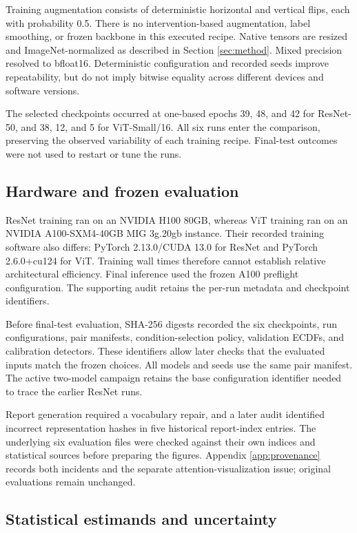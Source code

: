 Training augmentation consists of deterministic horizontal and vertical flips, each with probability 0.5. There is no intervention-based augmentation, label smoothing, or frozen backbone in this executed recipe. Native tensors are resized and ImageNet-normalized as described in Section \ref{sec:method}. Mixed precision resolved to bfloat16. Deterministic configuration and recorded seeds improve repeatability, but do not imply bitwise equality across different devices and software versions.

The selected checkpoints occurred at one-based epochs 39, 48, and 42 for ResNet-50, and 38, 12, and 5 for ViT-Small/16. All six runs enter the comparison, preserving the observed variability of each training recipe. Final-test outcomes were not used to restart or tune the runs.

\subsection{Hardware and frozen evaluation}

ResNet training ran on an NVIDIA H100 80GB, whereas ViT training ran on an NVIDIA A100-SXM4-40GB MIG 3g.20gb instance. Their recorded training software also differs: PyTorch 2.13.0/CUDA 13.0 for ResNet and PyTorch 2.6.0+cu124 for ViT. Training wall times therefore cannot establish relative architectural efficiency. Final inference used the frozen A100 preflight configuration. The supporting audit retains the per-run metadata and checkpoint identifiers.

Before final-test evaluation, SHA-256 digests recorded the six checkpoints, run configurations, pair manifests, condition-selection policy, validation ECDFs, and calibration detectors. These identifiers allow later checks that the evaluated inputs match the frozen choices. All models and seeds use the same pair manifest. The active two-model campaign retains the base configuration identifier needed to trace the earlier ResNet runs.

Report generation required a vocabulary repair, and a later audit identified incorrect representation hashes in five historical report-index entries. The underlying six evaluation files were checked against their own indices and statistical sources before preparing the figures. Appendix \ref{app:provenance} records both incidents and the separate attention-visualization issue; original evaluations remain unchanged.

\subsection{Statistical estimands and uncertainty}

